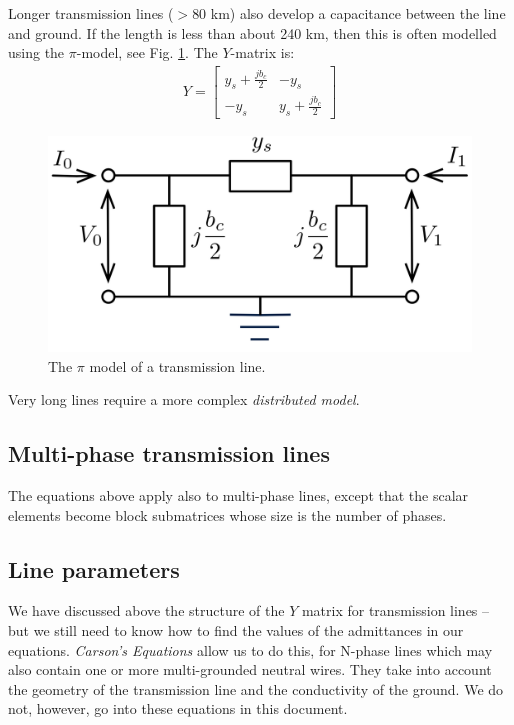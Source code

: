 \documentclass[10pt]{article}
\begin{document}
Longer transmission lines ($> 80$ km) also develop a capacitance between the line and ground. If the length is less than about 240 km, then this is often modelled using the $\pi$-model, see Fig. \ref{FIG_PI_LINE}. The $Y$-matrix is:
\begin{align}
	Y = \begin{bmatrix}y_s + \frac{j b_c}{2} & -y_s \\ -y_s & y_s + \frac{j b_c}{2} \end{bmatrix}
\end{align}
\begin{figure}[!h]
	\begin{center}
		\includegraphics[width=(5cm)]{pi_line}
	\end{center}
	\caption{
		The $\pi$ model of a transmission line.
	}
	\label{FIG_PI_LINE}
\end{figure}
Very long lines require a more complex \emph{distributed model}.

\subsection{Multi-phase transmission lines}
The equations above apply also to multi-phase lines, except that the scalar elements become block submatrices whose size is the number of phases.

\subsection{Line parameters}
We have discussed above the structure of the $Y$ matrix for transmission lines -- but we still need to know how to find the values of the admittances in our equations. \emph{Carson's Equations} allow us to do this, for N-phase lines which may also contain one or more multi-grounded neutral wires. They take into account the geometry of the transmission line and the conductivity of the ground. We do not, however, go into these equations in this document.
\end{document}
